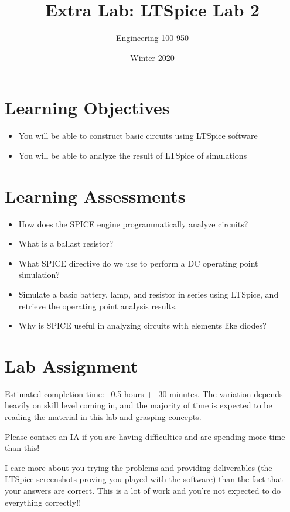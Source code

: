 \documentclass{article}
\title{Extra Lab: LTSpice Lab 2}
\date{Winter 2020}
\author{Engineering 100-950}
\begin{document}
\maketitle

\thispagestyle{fancy}

\section*{Learning Objectives}

\begin{itemize}
  \item You will be able to construct basic circuits using LTSpice software
  \item You will be able to analyze the result of LTSpice of simulations
\end{itemize}

\section*{Learning Assessments}

\begin{itemize}
  \item How does the SPICE engine programmatically analyze circuits?
  \item What is a ballast resistor?
  \item What SPICE directive do we use to perform a DC operating point simulation?
  \item Simulate a basic battery, lamp, and resistor in series using LTSpice, and retrieve the operating point analysis results.
  \item Why is SPICE useful in analyzing circuits with elements like diodes?
\end{itemize}

\section*{Lab Assignment}

Estimated completion time: ~0.5 hours +- 30 minutes. The variation depends heavily on skill level coming in, and the majority of time is expected to be reading the material in this lab and grasping concepts.

Please contact an IA if you are having difficulties and are spending more time than this!

I care more about you trying the problems and providing deliverables (the LTSpice screenshots proving you played with the software) than the fact that your answers are correct. This is a lot of work and you're not expected to do everything correctly!!
\end{document}
